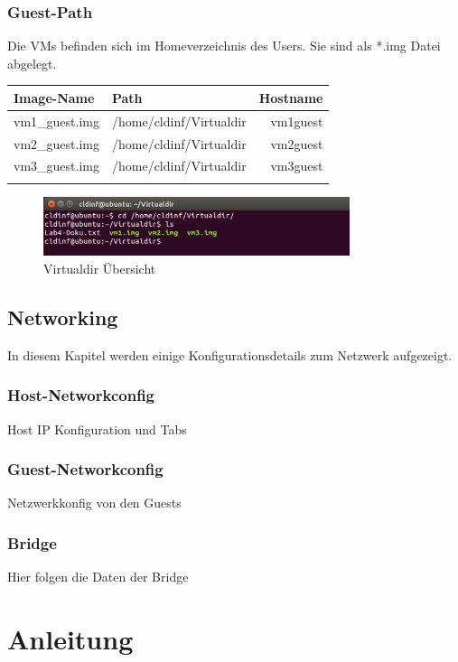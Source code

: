 \documentclass[a4,12pt]{scrartcl}
\begin{document}
\subsubsection{Guest-Path}
Die VMs befinden sich im Homeverzeichnis des Users. Sie sind als *.img Datei abgelegt.
\begin{center}
    \begin{tabular}{@{} l l r@{}}\toprule    
    {Image-Name} & {Path} & {Hostname}\\ \toprule
    vm1\_guest.img & /home/cldinf/Virtualdir & vm1guest\\ 
    vm2\_guest.img & /home/cldinf/Virtualdir & vm2guest\\
    vm3\_guest.img & /home/cldinf/Virtualdir & vm3guest\\ \addlinespace
    \bottomrule
    \end{tabular}
\end{center}

\begin{figure} [H]
	\begin{center}
	\includegraphics[width=0.80\textwidth]{./pictures/virtualdir.jpg}
	\caption{{Virtualdir Übersicht}}
	\label{virtualdir}
	\end{center}
\end{figure}



\subsection{Networking}
In diesem Kapitel werden einige Konfigurationsdetails zum Netzwerk aufgezeigt. 

\subsubsection{Host-Networkconfig}
Host IP Konfiguration und Tabs 

\subsubsection{Guest-Networkconfig}
Netzwerkkonfig von den Guests 

\subsubsection{Bridge}
Hier folgen die Daten der Bridge

\section{Anleitung}
\end{document}
